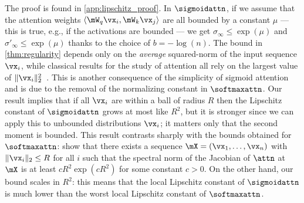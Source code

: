 The proof is found in \cref{app:lipschitz_proof}.
In $\sigmoidattn$, if we assume that the attention weights $\langle \mW_q \vx_i, \mW_k \vx_j\rangle$ are all bounded by a constant $\mu$ --- this is true, e.g., if the activations are bounded --- we get $\sigma_{\infty}\leq \exp(\mu)$ and $\sigma'_{\infty}\leq\exp(\mu)$ thanks to the choice of $b = -\log(n)$.
The bound in \cref{thm:regularity} depends only on the \emph{average} squared-norm of the input sequence $\vx_i$, while classical results for the study of attention all rely on the largest value of $\|\vx_i\|^2_2$~\citep{kim2021lipschitz,castin2023understanding}. 
This is another consequence of the simplicity of sigmoid attention and is due to the removal of the normalizing constant in $\softmaxattn$.
Our result implies that if all $\vx_i$ are within a ball of radius $R$ then the Lipschitz constant of $\sigmoidattn$ grows at most like $R^2$, but it is stronger since we can apply this to unbounded distributions $\vx_i$; it matters only that the second moment is bounded.
This result contrasts sharply with the bounds obtained for $\softmaxattn$: \citet[Thm.~3.4.]{castin2023understanding} show that there exists a sequence $\mX = (\vx_1, \dots, \vx_n)$ with $\|\vx_i\|_2\leq R$ for all $i$ such that the spectral norm of the Jacobian of $\attn$ at $\mX$ is at least $cR^2\exp(cR^2)$ for some constant $c>0$.
On the other hand, our bound scales in $R^2$: this means that the local Lipschitz constant of $\sigmoidattn$ is much lower than the worst local Lipschitz constant of $\softmaxattn$.
